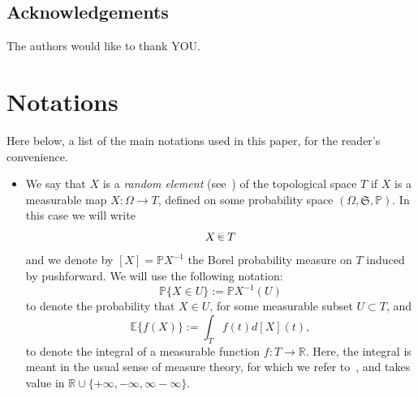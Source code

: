 \documentclass[10pt]{amsart}
\theoremstyle{definition}\newtheorem{defi}[theo]{Definition}\newtheorem{rema}[theo]{Remark}\newtheorem{exam}[theo]{Example}\newtheorem{exem}[theo]{Example}\newtheorem{nota}[theo]{Notation}
\newcommand{\R}{\mathbb{R}}
\newcommand{\PP}{\mathbb{P}}
\newcommand{\EE}{\mathbb{E}}
\newcommand{\Prob}{(\Omega, \mathfrak{S},\PP)}
\newcommand*\randin{
\mathchoice {\raisebox{-.35ex}{$\displaystyle{^\subset}$}\mkern-11.5mu\raisebox{+.45ex}{$\displaystyle{_\subset}$}} {\mkern+1mu\raisebox{-.27ex}{$\textstyle{^\subset}$}\mkern-11.7mu\raisebox{+.45ex}{$\textstyle{_\subset}$}} {\raisebox{.35ex}{$\scriptstyle\subset$}\mkern-14mu\raisebox{-.15ex}{$\scriptstyle\subset$}} {\raisebox{.3ex}{$\scriptscriptstyle\subset$}\mkern-13.5mu\raisebox{-.10ex}{$\scriptscriptstyle\subset$}}}
\begin{document}
\subsection{Acknowledgements}
The authors would like to thank YOU.



\section{Notations}\label{sec:notations}

Here below, a list of the main notations used in this paper, for the reader's convenience.
\begin{itemize}
\item We say that $X$ is a \emph{random element} (see~\cite{Billingsley}) of the topological space $T$ if $X$ is a measurable map $X\colon \Omega\to T$, defined on some probability space $\Prob$. In this case we will write
\begin{equation*}
X\,\randin\, T
\end{equation*}
and we denote by $[X]=\PP X^{-1}$ the Borel probability measure on $T$ induced by pushforward. We will use the following notation:
\begin{equation*}
\PP\{X\in U\}:=\PP X^{-1}(U)
\end{equation*}
to denote the probability that $X\in U$, for some measurable subset $U\subset T$, and
\begin{equation*}
\EE\{f(X)\}:=\int_{T}f(t)d[X](t),
\end{equation*}
to denote the integral of a measurable function $f\colon T\to \R$. Here, the integral is meant in the usual sense of measure theory, for which we refer to~\cite[section~15]{Bill_prob}, and takes value in $\R\cup\{+\infty,-\infty,\infty-\infty\}$.


\end{itemize}
\end{document}
